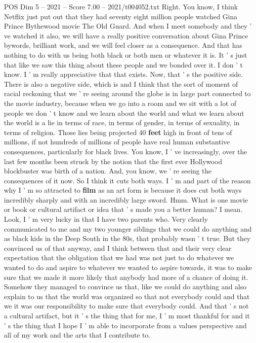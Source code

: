\begin{textsample}{POS Dim 5 – 2021 – Score 7.00 – 2021/t004052.txt}
Right.
You know, I think Netflix just put out that they had seventy eight million people watched Gina Prince Bythewood movie The Old Guard.
And when I meet somebody and they ' ve watched it also, we will have a really positive conversation about Gina Prince bywords, brilliant work, and we will feel closer as a consequence.
And that has nothing to do with us being both black or both men or whatever it is.
It ' s just that like we saw this thing about these people and we bonded over it.
I don ' t know.
I ' m really appreciative that that exists.
Now, that ' s the positive side.
There is also a negative side, which is and I think that the sort of moment of racial reckoning that we ' re seeing around the globe is in large part connected to the movie industry, because when we go into a room and we sit with a lot of people we don ' t know and we learn about the world and what we learn about the world is a lie in terms of race, in terms of gender, in terms of sexuality, in terms of religion.
Those lies being projected 40 \textbf{feet} high in front of tens of millions, if not hundreds of millions of people have real human substantive consequences, particularly for black lives.
You know, I ' ve increasingly, over the last few months been struck by the notion that the first ever Hollywood blockbuster was birth of a nation.
And, you know, we ' re seeing the consequences of it now.
So I think it cuts both ways.
I ' m and part of the reason why I ' m so attracted to \textbf{film} as an art form is because it does cut both ways incredibly sharply and with an incredibly large sword.
Hmm.
What is one movie or book or cultural artifact or idea that ' s made you a better human?
I mean.
Look, I ' m very lucky in that I have two parents who.
Very clearly communicated to me and my two younger siblings that we could do anything and as black kids in the Deep South in the 80s, that probably wasn ' t true.
But they convinced us of that anyway, and I think between that and their very clear expectation that the obligation that we had was not just to do whatever we wanted to do and aspire to whatever we wanted to aspire towards, it was to make sure that we made it more likely that anybody had more of a chance of doing it.
Somehow they managed to convince us that, like we could do anything and also explain to us that the world was organized so that not everybody could and that we it was our responsibility to make sure that everybody could.
And that ' s not a cultural artifact, but it ' s the thing that for me, I ' m most thankful for and it ' s the thing that I hope I ' m able to incorporate from a values perspective and all of my work and the arts that I contribute to.

\end{textsample}

